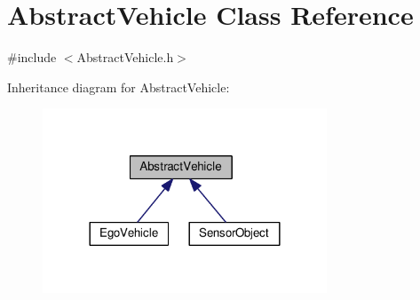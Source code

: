 \hypertarget{classAbstractVehicle}{}\section{Abstract\+Vehicle Class Reference}
\label{classAbstractVehicle}


{\ttfamily \#include $<$Abstract\+Vehicle.\+h$>$}



Inheritance diagram for Abstract\+Vehicle\+:\nopagebreak
\begin{figure}[H]
\begin{center}
\leavevmode
\includegraphics[width=240pt]{classAbstractVehicle__inherit__graph}
\end{center}
\end{figure}
